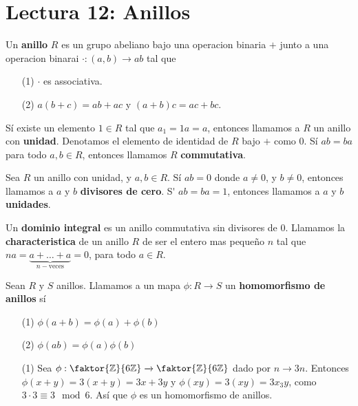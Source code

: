 \section*{Lectura 12: Anillos}

\begin{definition}
    Un \textbf{anillo} $R$ es un grupo abeliano bajo una operacion binaria  $+$
    junto a una operacion binarai $\cdot:(a,b) \xrightarrow{} ab$ tal que
    \begin{enumerate}
        \item[(1)] $\cdot$ es associativa.

        \item[(2)] $a(b+c)=ab+ac$ y $(a+b)c=ac+bc$.
    \end{enumerate}
    S\'i existe un elemento $1 \in R$ tal que  $a_1=1a=a$, entonces llamamos a
    $R$ un anillo con  \textbf{unidad}. Denotamos el elemento de identidad de
    $R$ bajo  $+$ como  $0$. S\'i $ab=ba$ para todo  $a,b \in R$, entonces
    llamamos  $R$  \textbf{commutativa}.
\end{definition}

\begin{definition}
    Sea $R$ un anillo con unidad, y  $a,b \in R$. S\'i $ab=0$ donde  $a\neq 0$,
     y $b \neq 0$, entonces llamamos a $a$ y  $b$  \textbf{divisores de cero}.
     S\' $ab=ba=1$, entonces llamamos a  $a$ y  $b$  \textbf{unidades}.
\end{definition}

\begin{definition}
    Un \textbf{dominio integral} es un anillo commutativa sin divisores de $0$.
    Llamamos la  \textbf{characteristica} de un anillo $R$ de ser el entero mas
    peque\~no $n$ tal que $na=\underbrace{a+\dots+a}_{n-\text{veces}}=0$, para
    todo $a \in R$.
\end{definition}

\begin{definition}
    Sean $R$ y  $S$ anillos. Llamamos a un mapa  $\phi:R \xrightarrow{} S$ un
    \textbf{homomorfismo de anillos} s\'i
    \begin{enumerate}
        \item[(1)] $\phi(a+b)=\phi(a)+\phi(b)$

        \item[(2)] $\phi(ab)=\phi(a)\phi(b)$
    \end{enumerate}
\end{definition}

\begin{example}\label{}
    \begin{enumerate}
        \item[(1)] Sea $\phi:\faktor{\Z}{6\Z} \xrightarrow{} \faktor{\Z}{6\Z}$
            dado por $n \xrightarrow{} 3n$. Entonces $\phi(x+y)=3(x+y)=3x+3y$ y
            $\phi(xy)=3(xy)=3x_3y$, como $3 \cdot 3 \equiv 3 \mod{6}$. As\'i que
            $\phi$ es un homomorfismo de anillos.
    \end{enumerate}
\end{example}

